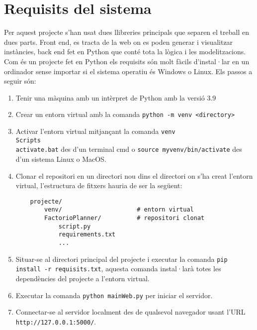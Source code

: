 


\chapter{Requisits del sistema} %

\label{Requisits del sistema} %

Per aquest projecte s'han usat dues llibreries principals que separen el treball en dues parts. Front end, es tracta de la web on es poden generar i visualitzar instàncies, back end fet en Python que conté tota la lògica i les modelitzacions.\\
Com és un projecte fet en Python els requisits són molt fàcils d'instal·lar en un ordinador sense importar si el sistema operatiu és Windows o Linux. Els passos a seguir són:
\begin{enumerate}[label=Pas \arabic*:]
\item Tenir una màquina amb un intèrpret de Python amb la versió 3.9
\item Crear un entorn virtual amb la comanda \texttt{python -m venv <directory>}
\item Activar l'entorn virtual mitjançant la comanda \texttt{venv\\Scripts\\activate.bat} des d'un terminal cmd o \texttt{source myvenv/bin/activate} des d'un sistema Linux o MacOS.
\item Clonar el repositori en un directori nou dins el directori on s'ha creat l'entorn virtual, l'estructura de fitxers hauria de ser la següent: 
    \begin{verbatim}
    projecte/
        venv/                     # entorn virtual
        FactorioPlanner/          # repositori clonat
            script.py
            requirements.txt
            ...
    \end{verbatim}
\item Situar-se al directori principal del projecte i executar la comanda \texttt{pip install -r requisits.txt}, aquesta comanda instal·larà totes les dependències del projecte a l'entorn virtual.
\item Executar la comanda \texttt{python mainWeb.py} per iniciar el servidor.
\item Connectar-se al servidor localment des de qualsevol navegador usant l'URL \texttt{http://127.0.0.1:5000/}.
\end{enumerate}

